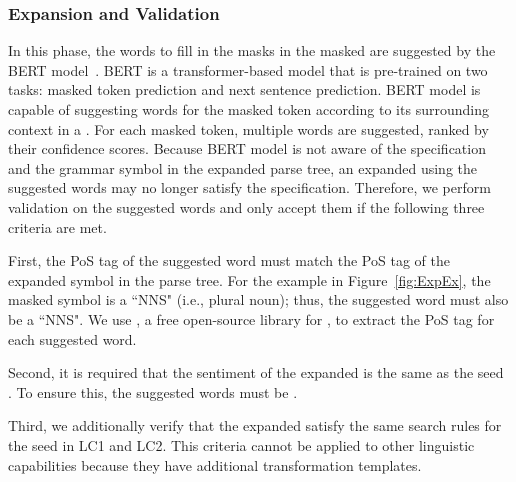 \subsubsection{\Sent Expansion and Validation}

In this phase, the words to fill in the masks in the masked \sents are
suggested by the BERT model~\cite{devlin2019bert}. 
BERT is a transformer-based \nl model that is pre-trained on two tasks: masked token prediction and next sentence prediction. BERT model is capable of suggesting words for the masked
token according to its surrounding context in a \sent. For each masked
token, multiple words are suggested, ranked by their confidence scores.
%
Because BERT model is not aware of the \lc
specification and the grammar symbol in the expanded parse tree, an
expanded \sent using the suggested words may no longer satisfy the
\lc specification. Therefore, we perform validation
on the suggested words and only accept them if the following three
criteria are met.

First, the PoS tag of the suggested word must match the PoS tag of the
expanded symbol in the parse tree. For the example in
Figure~\ref{fig:ExpEx}, the masked symbol is a ``NNS" (i.e., plural
noun); thus, the suggested word must also be a ``NNS". We use \spacy \cite{spacy}, a free open-source library for \nlp, to extract the PoS
tag for each suggested word.

Second, it is required that the
sentiment of the expanded \sent is the same as the seed \sent. To
ensure this, the suggested words must be \neu. 

Third, we additionally verify that the
expanded \sents satisfy the same search rules for the seed
\sent in LC1 and LC2. This criteria cannot be applied to other linguistic capabilities because they have additional transformation templates.



